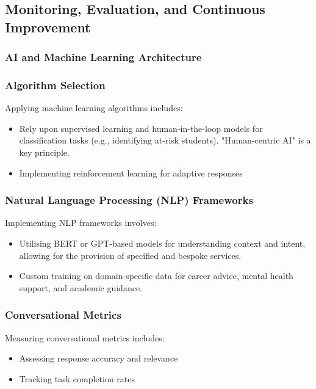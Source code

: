 \documentclass[14pt,a4paper]{article}
\begin{document}
\begin{multicols}{2}
\newpage
\subsection{Monitoring, Evaluation, and Continuous Improvement}
\subsubsection{AI and Machine Learning Architecture}

\subsubsection*{Algorithm Selection}
Applying machine learning algorithms \textit{\parencite[pp. 25-50]{Geron2024}} includes:
\begin{itemize}
    \item Rely upon supervised learning and human-in-the-loop models for classification tasks (e.g., identifying at-risk students). "Human-centric AI" is a key principle.
    \item Implementing reinforcement learning for adaptive responses
\end{itemize}
\subsubsection*{Natural Language Processing (NLP) Frameworks}
Implementing NLP frameworks \textit{\parencite[pp. 1-15]{JurafskyMartin2024}} involves:
\begin{itemize}
    \item Utilising BERT or GPT-based models for understanding context and intent, allowing for the provision of specified and bespoke services.
    \item Custom training on domain-specific data for career advice, mental health support, and academic guidance.
\end{itemize}


\subsubsection{Conversational Metrics}
Measuring conversational metrics \textit{\parencite[pp. 1-32]{Quarteroni2024}} includes:
\begin{itemize}
    \item Assessing response accuracy and relevance
    \item Tracking task completion rates
\end{itemize}


\end{multicols}
\end{document}
